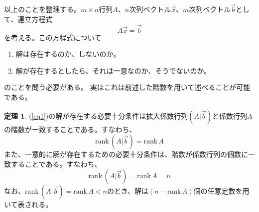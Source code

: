 \documentclass[10pt]{jsreport}
\theoremstyle{definition}%
\newtheorem{thm}{定理}[section]%
\newcommand{\vc}[1]{\overrightarrow{#1}}%
\newcommand{\rank}{\mathrm{rank\,}}
\numberwithin{equation}{section}%
\begin{document}
以上のことを整理する。$m\times n$行列$A$、$n$次列ベクトル$\vc{x}$、$m$次列ベクトル$\vc{b}$として、連立方程式
\begin{equation}
\label{eq1}  A\vc{x}=\vc{b}
\end{equation}
を考える。この方程式について
\begin{enumerate}
  \item 解は存在するのか、しないのか。
  \item 解が存在するとしたら、それは一意なのか、そうでないのか。
\end{enumerate}
のことを問う必要がある。
実はこれは前述した階数を用いて述べることが可能である。
\begin{screen}
 \begin{thm}\label{teiri} 
    (\ref{eq1})の解が存在する必要十分条件は拡大係数行列$(A| \vc{b })$と係数行列$A$の階数が一致することである。すなわち、
    \begin{equation}
      \rank(A|\vc{b})=\rank A
    \end{equation}
  また、一意的に解が存在するための必要十分条件は、階数が係数行列の個数に一致することである。すなわち、
  \begin{equation}
    \rank(A|\vc{b})=\rank A=n
  \end{equation}
  なお、$\rank(A|\vc{b})=\rank A<n$のとき、解は$(n-\rank A)$個の任意定数を用いて表される。
  \end{thm}
\end{screen}
\end{document}
